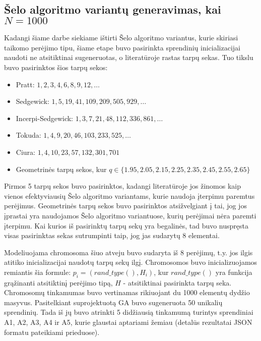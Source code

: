 \documentclass{VUMIFInfKursinis}
\begin{document}
\subsection{Šelo algoritmo variantų generavimas, kai $N = 1000$}

Kadangi šiame darbe siekiame ištirti Šelo algoritmo variantus, kurie skiriasi taikomo perėjimo tipu,
šiame etape buvo pasirinkta sprendinių inicializacijai naudoti ne atsitiktinai sugeneruotas, o literatūroje rastas tarpų sekas.
Tuo tikslu buvo pasirinktos šios tarpų sekos:
\begin{itemize}
  \item Pratt: $1, 2, 3, 4, 6, 8, 9, 12, \ldots$ \cite{pratt1972shellsort}
  \item Sedgewick: $1, 5, 19, 41, 109, 209, 505, 929, \ldots$ \cite{SEDGEWICK1986159}
  \item Incerpi-Sedgewick: $1, 3, 7, 21, 48, 112, 336, 861, \ldots$ \cite{incerpi1985improved}
  \item Tokuda: $1, 4, 9, 20, 46, 103, 233, 525, \ldots $ \cite{10.5555/645569.659879}
  \item Ciura: $1, 4, 10, 23, 57, 132, 301, 701$ \cite{ciura2001best}
  \item Geometrinės tarpų sekos, kur $ q \in \{1.95, 2.05, 2.15, 2.25, 2.35, 2.45, 2.55, 2.65 \}$ \cite{Radavičius_Baranauskas_2013}
\end{itemize}
Pirmos 5 tarpų sekos buvo pasirinktos, kadangi literatūroje jos žinomos kaip vienos efektyviausių
Šelo algoritmo variantams, kurie naudoja įterpimu paremtus perėjimus.
Geometrinės tarpų sekos buvo pasirinktos atsižvelgiant į tai, jog jos įprastai yra naudojamos
Šelo algoritmo variantuose, kurių perėjimai nėra paremti įterpimu.
Kai kurios iš pasirinktų tarpų sekų yra begalinės, tad buvo nuspręsta visas pasirinktas sekas sutrumpinti taip, jog jas sudarytų 8 elementai.

Modeliuojama chromosoma šiuo atveju buvo sudaryta iš 8 perėjimų, t.y. jos ilgis atitiko
inicializacijai naudotų tarpų sekų ilgį.
Chromosomos buvo inicializuojamos remiantis šia formule:
$p_i = (rand\_type(), H_i)$, kur $rand\_type()$ yra funkcija grąžinanti atsitiktinį perėjimo tipą, $H$ - atsitiktinai pasirinkta tarpų seka.
Chromosomų tinkamumas buvo vertinamas rikiuojant du 1000 elementų dydžio masyvus.
Pasitelkiant suprojektuotą GA buvo sugeneruota 50 unikalių sprendinių.
Tada iš jų buvo atrinkti 5 didžiausią tinkamumą turintys sprendiniai A1, A2, A3, A4 ir A5, kurie glaustai aptariami žemiau (detalūs rezultatai JSON formatu pateikiami prieduose).
\end{document}
